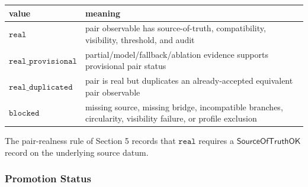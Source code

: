 \documentclass[11pt]{article}
\theoremstyle{definition}
\begin{document}
\begin{longtable}[]{@{}ll@{}}
\toprule
\begin{minipage}[b]{0.19\columnwidth}\raggedright
value\strut
\end{minipage} & \begin{minipage}[b]{0.75\columnwidth}\raggedright
meaning\strut
\end{minipage}\tabularnewline
\midrule
\endhead
\begin{minipage}[t]{0.19\columnwidth}\raggedright
\(\texttt{real}\)\strut
\end{minipage} & \begin{minipage}[t]{0.75\columnwidth}\raggedright
pair observable has source-of-truth, compatibility, visibility, threshold, and audit\strut
\end{minipage}\tabularnewline
\begin{minipage}[t]{0.19\columnwidth}\raggedright
\(\texttt{real\_provisional}\)\strut
\end{minipage} & \begin{minipage}[t]{0.75\columnwidth}\raggedright
partial/model/fallback/ablation evidence supports provisional pair status\strut
\end{minipage}\tabularnewline
\begin{minipage}[t]{0.19\columnwidth}\raggedright
\(\texttt{real\_duplicated}\)\strut
\end{minipage} & \begin{minipage}[t]{0.75\columnwidth}\raggedright
pair is real but duplicates an already-accepted equivalent pair observable\strut
\end{minipage}\tabularnewline
\begin{minipage}[t]{0.19\columnwidth}\raggedright
\(\texttt{blocked}\)\strut
\end{minipage} & \begin{minipage}[t]{0.75\columnwidth}\raggedright
missing source, missing bridge, incompatible branches, circularity, visibility failure, or profile exclusion\strut
\end{minipage}\tabularnewline
\bottomrule
\end{longtable}

The pair-realness rule of Section 5 records that \(\texttt{real}\) requires a \(\mathsf{SourceOfTruthOK}\) record on the underlying source datum.

\subsubsection{Promotion Status}
\end{document}
